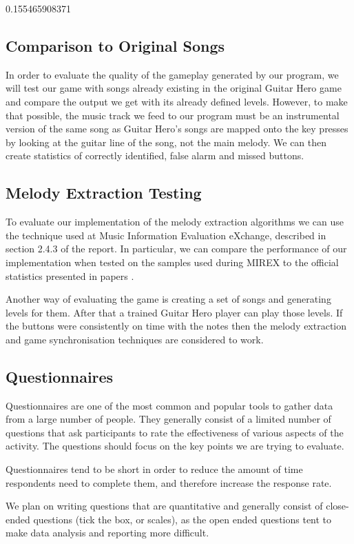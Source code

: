 0.155465908371

\subsection{Comparison to Original Songs}
In order to evaluate the quality of the gameplay generated by our program, we will test our game with songs already existing in the original Guitar Hero game and compare the output we get with its already defined levels. However, to make that possible, the music track we feed to our program must be an instrumental version of the same song as Guitar Hero's songs are mapped onto the key presses by looking at the guitar line of the song, not the main melody. We can then create statistics of correctly identified, false alarm and missed buttons.

\subsection{Melody Extraction Testing}
To evaluate our implementation of the melody extraction algorithms we can use the technique used at Music Information Evaluation eXchange, described in section 2.4.3 of the report. In particular, we can compare the performance of our implementation when tested on the samples used during MIREX to the official statistics presented in papers \cite{salamon, comparison}.

Another way of evaluating the game is creating a set of songs and generating levels for them. After that a trained Guitar Hero player can play those levels. If the buttons were consistently on time with the notes then the melody extraction and game synchronisation techniques are considered to work.

\subsection{Questionnaires}
Questionnaires are one of the most common and popular tools to gather data from a large number of people. They generally consist of a limited number of questions that ask participants to rate the effectiveness of various aspects of the activity. The questions should focus on the key points we are trying to evaluate. 

Questionnaires tend to be short in order to reduce the amount of time respondents need to complete them, and therefore increase the response rate. 

We plan on writing questions that are quantitative and generally consist of close-ended questions (tick the box, or scales), as the open ended questions tent to make data analysis and reporting more difficult.